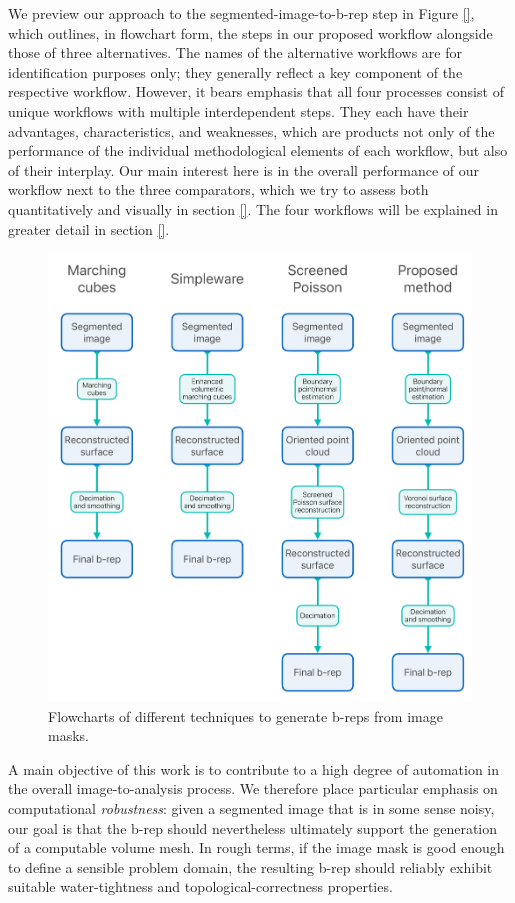 We preview our approach to the segmented-image-to-b-rep step in Figure \ref{}, which outlines, in flowchart form, the steps in our proposed workflow alongside those of three alternatives.  The names of the alternative workflows are for identification purposes only; they generally reflect a key component of the respective workflow.  However, it bears emphasis that all four processes consist of unique workflows with multiple interdependent steps. They each have their advantages, characteristics, and weaknesses, which are products not only of the performance of the individual methodological elements of each workflow, but also of their interplay.  Our main interest here is in the overall performance of our workflow next to the three comparators, which we try to assess both quantitatively and visually in section \ref{}.  The four workflows will be explained in greater detail in section \ref{}.
\begin{figure}[t]
	\centering
		\includegraphics[scale=0.3]{media/flowchartNew.pdf}
	\caption{Flowcharts of different techniques to generate b-reps from image masks.}
	\label{fig:flowchart}
\end{figure}\noindent

A main objective of this work is to
contribute to a high degree of automation in the overall image-to-analysis process.  We therefore place particular emphasis on 
computational {\em robustness}:  given a segmented image that is in some sense noisy, our goal is that the b-rep should nevertheless ultimately support the generation of a computable volume mesh.  In rough terms, if the image mask is good enough to define a sensible problem domain, the resulting b-rep should reliably exhibit suitable water-tightness and topological-correctness properties.

